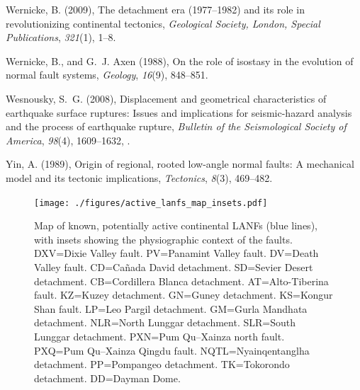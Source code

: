 \documentclass[draft,grl]{AGUTeX}
\begin{document}
\begin{article}
\begin{thebibliography}{46}
Wernicke, B. (2009), The detachment era (1977--1982) and its role in
  revolutionizing continental tectonics, \textit{Geological Society, London,
  Special Publications}, \textit{321}(1), 1--8.

Wernicke, B., and G.~J. Axen (1988), On the role of isostasy in the evolution
  of normal fault systems, \textit{Geology}, \textit{16}(9), 848--851.

Wesnousky, S.~G. (2008), Displacement and geometrical characteristics of
  earthquake surface ruptures: Issues and implications for seismic-hazard
  analysis and the process of earthquake rupture, \textit{Bulletin of the
  Seismological Society of America}, \textit{98}(4), 1609--1632,
  .

Yin, A. (1989), Origin of regional, rooted low-angle normal faults: {A}
  mechanical model and its tectonic implications, \textit{Tectonics},
  \textit{8}(3), 469--482.

\end{thebibliography}


%

\end{article}
\begin{figure}
\noindent\texttt{[image: ./figures/active\_lanfs\_map\_insets.pdf]}
\caption{Map of known, potentially active continental LANFs (blue lines), with
insets showing the physiographic context of the faults.  DXV=Dixie Valley
fault.  PV=Panamint Valley fault.  DV=Death Valley fault.  CD=Ca\~nada David
detachment.  SD=Sevier Desert detachment.  CB=Cordillera Blanca detachment.  
AT=Alto-Tiberina fault.  KZ=Kuzey detachment.  GN=Guney detachment.  
KS=Kongur Shan fault.  LP=Leo Pargil detachment.  GM=Gurla Mandhata 
detachment. NLR=North Lunggar detachment.  SLR=South Lunggar detachment.  
PXN=Pum Qu--Xainza north fault.  PXQ=Pum Qu--Xainza Qingdu fault. 
NQTL=Nyainqentanglha detachment.  PP=Pompangeo detachment.  
TK=Tokorondo detachment.  DD=Dayman Dome.}
\label{fig:lanf_map}
\end{figure}
\end{document}
